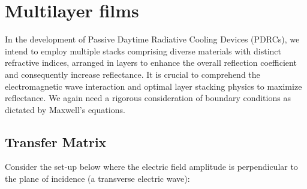 \section{Multilayer films}
In the development of Passive Daytime Radiative Cooling Devices (PDRCs), we intend to employ multiple stacks comprising diverse materials with distinct refractive indices, arranged in layers to enhance the overall reflection coefficient and consequently increase reflectance. It is crucial to comprehend the electromagnetic wave interaction and optimal layer stacking physics to maximize reflectance. We again need a rigorous consideration of boundary conditions as dictated by Maxwell's equations.

\subsection{Transfer Matrix}
Consider the set-up below where the electric field amplitude is perpendicular to the plane of incidence (a transverse electric wave):




